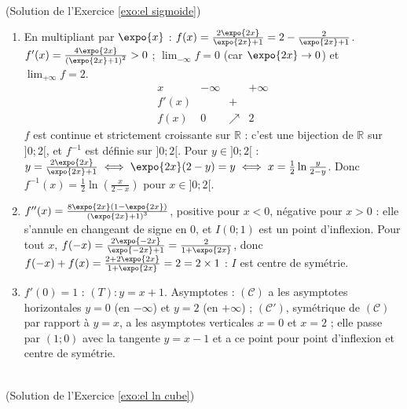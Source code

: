 \begin{corrige}
\begin{sol} ~ \\
(Solution de l'Exercice \ref{exo:el sigmoide})
\begin{enumerate}
\item En multipliant par $\expo{x}$ : $f(x) = \frac{2\expo{2x}}{\expo{2x}+1} = 2 - \frac{2}{\expo{2x}+1}$.
      $f'(x) = \frac{4\expo{2x}}{\left(\expo{2x}+1\right)^2} > 0$ ; $\lim_{-\infty} f = 0$ (car $\expo{2x} \to 0$) et $\lim_{+\infty} f = 2$.
      \[
      \begin{array}{c|ccc}
      x & -\infty & & +\infty \\ \hline
      f'(x) & & + & \\ \hline
      f(x) & 0 & \nearrow & 2
      \end{array}
      \]
      $f$ est continue et strictement croissante sur $\mathbb{R}$ : c'est une bijection de $\mathbb{R}$ sur $]0;2[$, et $f^{-1}$ est d\'efinie sur $]0;2[$.
      Pour $y \in ]0;2[$ : $y = \frac{2\expo{2x}}{\expo{2x}+1} \iff \expo{2x}(2 - y) = y \iff x = \frac{1}{2}\ln\frac{y}{2-y}$.
      Donc $f^{-1}(x) = \frac{1}{2}\ln\left(\frac{x}{2-x}\right)$ pour $x \in ]0;2[$.
\item $f''(x) = \frac{8\expo{2x}\left(1 - \expo{2x}\right)}{\left(\expo{2x}+1\right)^3}$, positive pour $x < 0$, n\'egative pour $x > 0$ :
      elle s'annule en changeant de signe en $0$, et $I(0 ; 1)$ est un point d'inflexion.
      Pour tout $x$, $f(-x) = \frac{2\expo{-2x}}{\expo{-2x}+1} = \frac{2}{1 + \expo{2x}}$, donc $f(-x) + f(x) = \frac{2 + 2\expo{2x}}{1 + \expo{2x}} = 2 = 2 \times 1$ :
      $I$ est centre de sym\'etrie.
\item $f'(0) = 1$ : $(T) : y = x + 1$. Asymptotes : $(\mathscr{C})$ a les asymptotes horizontales $y = 0$ (en $-\infty$) et $y = 2$ (en $+\infty$) ;
      $(\mathscr{C}')$, sym\'etrique de $(\mathscr{C})$ par rapport \`a $y = x$, a les asymptotes verticales $x = 0$ et $x = 2$ ; elle passe par $(1;0)$ avec la
      tangente $y = x - 1$ et a ce point pour point d'inflexion et centre de sym\'etrie.
\end{enumerate}
\end{sol}

\begin{sol} ~ \\
(Solution de l'Exercice \ref{exo:el ln cube})


\end{sol}
\end{corrige}
